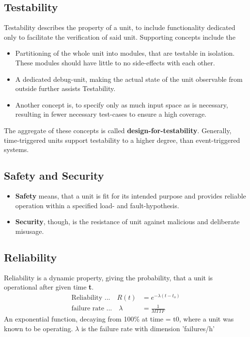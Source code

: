 \documentclass[master,english,smartquotes,apa]{hgbthesis}
\begin{document}
	\subsection{Testability}
	{Testability} describes the property of a unit, to include functionality dedicated only to facilitate the verification of said unit. Supporting concepts include the \\
	\begin{itemize}
		\item Partitioning of the whole unit into modules, that are testable in isolation. These modules should have little to no side-effects with each other. 
		\item A dedicated debug-unit, making the actual state of the unit observable from outside further assists Testability. 
		\item Another concept is, to specify only as much input space as is necessary, resulting in fewer necessary test-cases to ensure a high coverage.
	\end{itemize}

	The aggregate of these concepts is called {\bf design-for-testability}.
	Generally, time-triggered units support testability to a higher degree, than event-triggered systems.
	\subsection{Safety and Security}
	\begin{itemize}
		\item {\bf Safety} means, that a unit is fit for its intended purpose and provides reliable operation within a specified load- and fault-hypothesis.
		\item {\bf Security}, though, is the resistance of unit against malicious and deliberate misusage.
	\end{itemize}
	\subsection{Reliability}
	{Reliability} is a dynamic property, giving the probability, that a unit is operational after given time {\bf t}.
		\begin{align*}
		\textrm{Reliability ...} \quad R(t) & = e^{-\lambda (t-t_o) }\\
		\textrm{failure rate ...}  \quad \lambda & = \frac{1}{MTTF} 
		\end{align*}
	An exponential function, decaying from 100\% at time = t0, where a unit was known to be operating. $\lambda$ is the failure rate with dimension 'failures/h'
	
\end{document}
